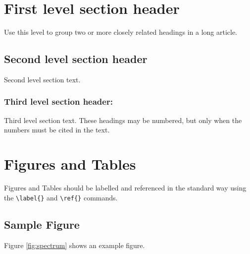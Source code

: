 \documentclass[9pt,twocolumn,twoside]{gsajnl}
\begin{document}
\section*{First level section header}

Use this level to group two or more closely related headings in a long article.

\subsection*{Second level section header}

Second level section text.

\subsubsection*{Third level section header:}

Third level section text. These headings may be numbered, but only when the numbers must be cited in the text. 

\section*{Figures and Tables}

Figures and Tables should be labelled and referenced in the standard way using the \verb|\label{}| and \verb|\ref{}| commands.

\subsection*{Sample Figure}

Figure \ref{fig:spectrum} shows an example figure.
\end{document}
